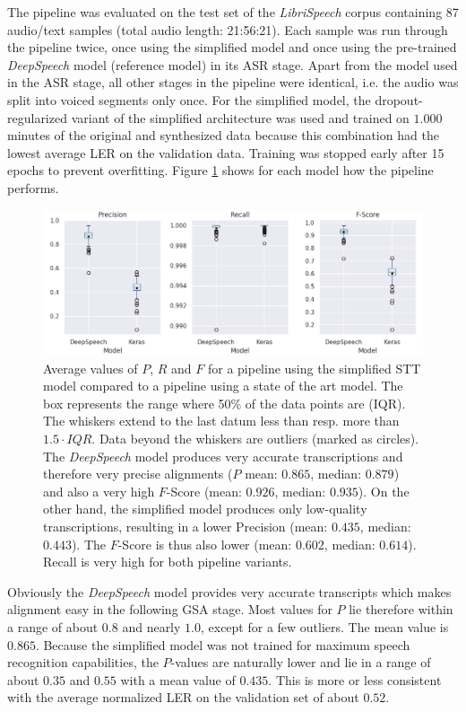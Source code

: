 The pipeline was evaluated on the test set of the \textit{LibriSpeech} corpus containing 87 audio/text samples (total audio length: 21:56:21). Each sample was run through the pipeline twice, once using the simplified model and once using the pre-trained \textit{DeepSpeech} model (reference model) in its \ac{ASR} stage. Apart from the model used in the \ac{ASR} stage, all other stages in the pipeline were identical, i.e. the audio was split into voiced segments only once. For the simplified model, the dropout-regularized variant of the simplified architecture was used and trained on $1.000$ minutes of the original and synthesized data because this combination had the lowest average \ac{LER} on the validation data. Training was stopped early after 15 epochs to prevent overfitting. Figure \ref{pipeline_boxplot_ls_en} shows for each model how the pipeline performs. 

\begin{figure}[h!]
	\includegraphics[width=\linewidth]{./img/boxplot_ls.png}
	\caption{Average values of $P$, $R$ and $F$ for a pipeline using the simplified \ac{STT} model compared to a pipeline using a state of the art model. The box represents the range where 50\% of the data points are (\ac{IQR}). The whiskers extend to the last datum less than resp. more than $1.5 \cdot IQR$. Data beyond the whiskers are outliers (marked as circles). The \textit{DeepSpeech} model produces very accurate transcriptions and therefore very precise alignments ($P$ mean: $0.865$, median: $0.879$) and also a very high $F$-Score (mean: $0.926$, median: $0.935$). On the other hand, the simplified model produces only low-quality transcriptions, resulting in a lower Precision (mean: $0.435$, median: $0.443$). The $F$-Score is thus also lower (mean: $0.602$, median: $0.614$). Recall is very high for both pipeline variants.}
	\label{pipeline_boxplot_ls_en}
\end{figure}

Obviously the \textit{DeepSpeech} model provides very accurate transcripts which makes alignment easy in the following \ac{GSA} stage. Most values for $P$ lie therefore within a range of about $0.8$ and nearly $1.0$, except for a few outliers. The mean value is $0.865$. Because the simplified model was not trained for maximum speech recognition capabilities, the $P$-values are naturally lower and lie in a range of about $0.35$ and $0.55$ with a mean value of $0.435$. This is more or less consistent with the average normalized \ac{LER} on the validation set of about $0.52$.


